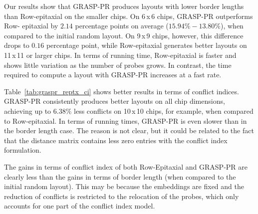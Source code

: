 Our results show that GRASP-PR produces layouts with lower border lengths than
Row-epitaxial on the smaller chips. On 6\,x\,6 chips, GRASP-PR outperforms Row-
epitaxial by $2.14$ percentage points on average ($15.94\% - 13.80\%$), when
compared to the initial random layout. On 9\,x\,9 chips, however, this
difference drops to $0.16$ percentage point, while Row-epitaxial generates
better layouts on 11\,x\,11 or larger chips. In terms of running time,
Row-epitaxial is faster and shows little variation as the number of probes
grows. In contrast, the time required to compute a layout with GRASP-PR
increases at a fast rate.

Table~\ref{tab:graspr_reptx_ci} shows better results in terms of conflict
indices. GRASP-PR consistently produces better layouts on all chip dimensions,
achieving up to $6.38$\% less conflicts on 10\,x\,10 chips, for example, when
compared to Row-epitaxial. In terms of running times, GRASP-PR is even slower
than in the border length case. The reason is not clear, but it could be related
to the fact that the distance matrix contains less zero entries with the
conflict index formulation.

The gains in terms of conflict index of both Row-Epitaxial and GRASP-PR are
clearly less than the gains in terms of border length (when compared to the
initial random layout). This may be because the embeddings are fixed and the
reduction of conflicts is restricted to the relocation of the probes, which only
accounts for one part of the conflict index model.

